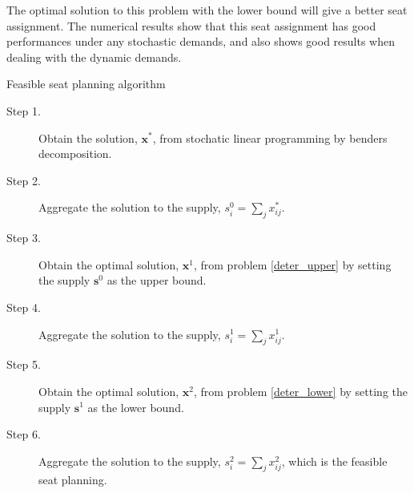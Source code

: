 The optimal solution to this problem with the lower bound will give a better seat assignment. The numerical results show that this seat assignment has good performances under any stochastic demands, and also shows good results when dealing with the dynamic demands. 






\begin{algorithm}[H]
  \caption{Feasible seat planning algorithm}\label{feasible_seat}
    \begin{description}
    \item[Step 1.] Obtain the solution, $\mathbf{x}^{*}$, from stochatic linear programming by benders decomposition.

    \item[Step 2.] Aggregate the solution to the supply, ${s}_{i}^{0} = \sum_{j} x^{*}_{ij}$.

    \item[Step 3.] Obtain the optimal solution, $\mathbf{x}^{1}$, from problem \eqref{deter_upper} by setting the supply $\mathbf{s}^{0}$ as the upper bound. 
    
    \item[Step 4.] Aggregate the solution to the supply, ${s}_{i}^{1} = \sum_{j} x^{1}_{ij}$.

    \item[Step 5.] Obtain the optimal solution, $\mathbf{x}^{2}$, from problem \eqref{deter_lower} by setting the supply $\mathbf{s}^{1}$ as the lower bound. 
    \item[Step 6.] Aggregate the solution to the supply, ${s}_{i}^{2} = \sum_{j} x^{2}_{ij}$, which is the feasible seat planning.
   \end{description}
  \end{algorithm}

